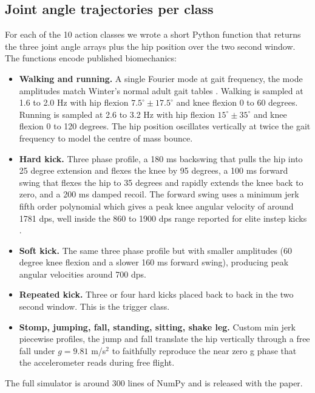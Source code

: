 \documentclass[conference]{IEEEtran}
\begin{document}
\subsection{Joint angle trajectories per class}
For each of the 10 action classes we wrote a short Python function that returns the three joint angle arrays plus the hip position over the two second window. The functions encode published biomechanics:
\begin{itemize}
  \item \textbf{Walking and running.} A single Fourier mode at gait frequency, the mode amplitudes match Winter's normal adult gait tables \cite{winter2009biomechanics}. Walking is sampled at 1.6 to 2.0 Hz with hip flexion $7.5^\circ \pm 17.5^\circ$ and knee flexion 0 to 60 degrees. Running is sampled at 2.6 to 3.2 Hz with hip flexion $15^\circ \pm 35^\circ$ and knee flexion 0 to 120 degrees. The hip position oscillates vertically at twice the gait frequency to model the centre of mass bounce.
  \item \textbf{Hard kick.} Three phase profile, a 180 ms backswing that pulls the hip into 25 degree extension and flexes the knee by 95 degrees, a 100 ms forward swing that flexes the hip to 35 degrees and rapidly extends the knee back to zero, and a 200 ms damped recoil. The forward swing uses a minimum jerk fifth order polynomial which gives a peak knee angular velocity of around 1781 dps, well inside the 860 to 1900 dps range reported for elite instep kicks \cite{lees2010biomechanics, kellis2007biomechanical}.
  \item \textbf{Soft kick.} The same three phase profile but with smaller amplitudes (60 degree knee flexion and a slower 160 ms forward swing), producing peak angular velocities around 700 dps.
  \item \textbf{Repeated kick.} Three or four hard kicks placed back to back in the two second window. This is the trigger class.
  \item \textbf{Stomp, jumping, fall, standing, sitting, shake leg.} Custom min jerk piecewise profiles, the jump and fall translate the hip vertically through a free fall under $g = 9.81$ m/s$^2$ to faithfully reproduce the near zero g phase that the accelerometer reads during free flight.
\end{itemize}

The full simulator is around 300 lines of NumPy and is released with the paper.
\end{document}

